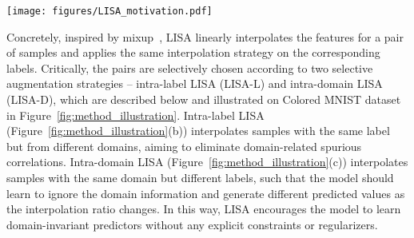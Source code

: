 \begin{figure*}[t]
\centering
  \texttt{[image: figures/LISA\_motivation.pdf]}
  \vspace{-0.5em}
  \caption{Illustration of the variants of LISA (Intra-label LISA and Intra-domain LISA) on Colored MNIST dataset. $\lambda$ represents the interpolation ratio, which is sampled from a Beta distribution. (a) Colored MNIST (CMNIST). We classify MNIST digits as two classes, and original digits (0,1,2,3,4) and (5,6,7,8,9) are labeled as class 0 and 1, respectively. Digit color is used as domain information, which is spuriously correlated with labels in training data; (b) Intra-label LISA (LISA-L) cancels out spurious correlation by interpolating samples with the same label; (c) Intra-domain LISA (LISA-D) interpolates samples with the same domain but different labels to encourage the model to learn specific features within a domain.
  }\label{fig:method_illustration}
  \vspace{-1.5em}
\end{figure*}

 Concretely, inspired by mixup~\citep{zhang2017mixup}, LISA linearly interpolates the features for a pair of samples and applies the same interpolation strategy on the corresponding labels. Critically, the pairs are selectively chosen according to two selective augmentation strategies -- intra-label LISA (LISA-L) and intra-domain LISA (LISA-D), which are described below and illustrated on Colored MNIST dataset in Figure~\ref{fig:method_illustration}. Intra-label LISA (Figure~\ref{fig:method_illustration}(b)) interpolates samples with the same label but from different domains, aiming to eliminate domain-related spurious correlations. Intra-domain LISA (Figure~\ref{fig:method_illustration}(c)) interpolates samples with the same domain but different labels, such that the model should learn to ignore the domain information and generate different predicted values as the interpolation ratio changes. In this way, LISA encourages the model to learn domain-invariant predictors without any explicit constraints or regularizers. 


